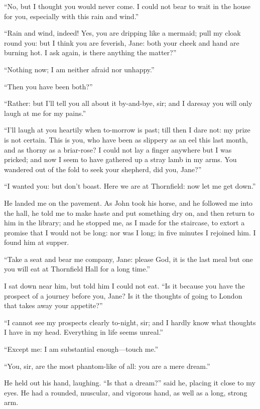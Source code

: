 \enquote{No, but I thought you would never come.  I could not bear to
	wait in the house for you, especially with this rain and wind.}

\enquote{Rain and wind, indeed!  Yes, you are dripping like a mermaid;
	pull my cloak round you: but I think you are feverish, Jane: both your
	cheek and hand are burning hot.  I ask again, is there anything the
	matter?}

\enquote{Nothing now; I am neither afraid nor unhappy.}

\enquote{Then you have been both?}

\enquote{Rather: but I'll tell you all about it by-and-bye, sir; and I
	daresay you will only laugh at me for my pains.}

\enquote{I'll laugh at you heartily when to-morrow is past; till then I
	dare not: my prize is not certain.  This is you, who have been as
	slippery as an eel this last month, and as thorny as a briar-rose?  I
	could not lay a finger anywhere but I was pricked; and now I seem to
	have gathered up a stray lamb in my arms.  You wandered out of the fold
	to seek your shepherd, did you, Jane?}

\enquote{I wanted you: but don't boast.  Here we are at Thornfield: now
	let me get down.}

He landed me on the pavement.  As John took his horse, and he followed
me into the hall, he told me to make haste and put something dry on, and
then return to him in the library; and he stopped me, as I made for the
staircase, to extort a promise that I would not be long: nor was I long;
in five minutes I rejoined him.  I found him at supper.

\enquote{Take a seat and bear me company, Jane: please God, it is the
	last meal but one you will eat at Thornfield Hall for a long time.}

I sat down near him, but told him I could not eat.  \enquote{Is it
	because you have the prospect of a journey before you, Jane?  Is it the
	thoughts of going to London that takes away your appetite?}

\enquote{I cannot see my prospects clearly to-night, sir; and I hardly
	know what thoughts I have in my head.  Everything in life seems unreal.}

\enquote{Except me: I am substantial enough---touch me.}

\enquote{You, sir, are the most phantom-like of all: you are a mere
	dream.}

He held out his hand, laughing.  \enquote{Is that a dream?} said he,
placing it close to my eyes.  He had a rounded, muscular, and vigorous
hand, as well as a long, strong arm.

